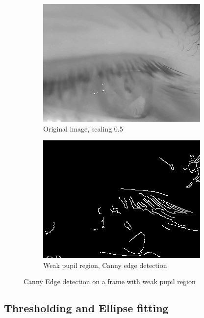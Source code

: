 \begin{figure}[ht]
    \centering
    \begin{subfigure}{.5\textwidth}
      \centering
      \includegraphics[width=.9\linewidth]{plots/orig_canny_eyelids.png}
      \caption{Original image, scaling 0.5}
      \label{fig:orig_canny_lids}
    \end{subfigure}%
    \begin{subfigure}{.5\textwidth}
      \centering
      \includegraphics[width=.9\linewidth]{plots/canny_eyelids.png}
      \caption{Weak pupil region, Canny edge detection}
      \label{fig:canny_eyelid}
    \end{subfigure}
    \caption{Canny Edge detection on a frame with weak pupil region}
    \label{fig:canny_eyelid}
\end{figure}

\subsection{Thresholding and Ellipse fitting}
